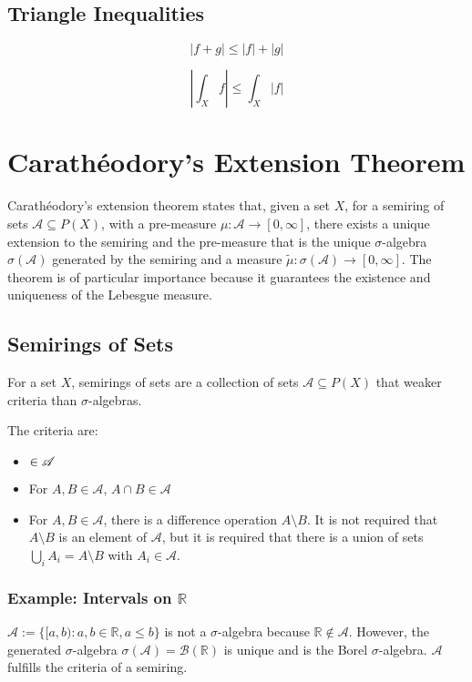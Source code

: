 \subsection{Triangle Inequalities}
\begin{equation}
|f+g| \leq |f| + |g|
\end{equation}

\begin{equation}
|\int_X f | \leq \int_X |f| 
\end{equation}

\section{Carath\'eodory's Extension Theorem}
Carath\'eodory's extension theorem states that, given a set $X$, for a semiring of sets $\mathscr{A}\subseteq P(X)$, with a pre-measure $\mu: \mathscr{A} \rightarrow [0,\infty]$, there exists a unique extension to the semiring and the pre-measure that is the unique $\sigma$-algebra $\sigma(\mathscr{A})$ generated by the semiring and a measure $\tilde{\mu}: \sigma(\mathscr{A})\rightarrow [0,\infty]$. The theorem is of particular importance because it guarantees the existence and uniqueness of the Lebesgue measure.

\subsection{Semirings of Sets}
For a set $X$, semirings of sets are a collection of sets $\mathscr{A}\subseteq P(X)$ that weaker criteria than $\sigma$-algebras.

The criteria are:

\begin{itemize}
\item $\empty \in \mathscr{A}$
\item For $A,B \in \mathscr{A}$, $A\cap B \in \mathscr{A}$
\item For $A,B \in \mathscr{A}$, there is a difference operation $A\setminus B$. It is not required that $A\setminus B$ is an element of $\mathscr{A}$, but it is required that there is a union of sets $\bigcup_i A_i = A\setminus B$ with $A_i \in \mathscr{A}$.
\end{itemize} 

\subsubsection{Example: Intervals on $\mathbb{R}$}
$\mathscr{A} := \{ [a,b) : a,b \in \mathbb{R}, a\leq b \}$ is not a $\sigma$-algebra because $\mathbb{R} \notin \mathscr{A}$. However, the generated $\sigma$-algebra $\sigma(\mathbb{\mathscr{A}}) = \mathscr{B}(\mathbb{R})$ is unique and is the Borel $\sigma$-algebra. $\mathscr{A}$ fulfills the criteria of a semiring. 


